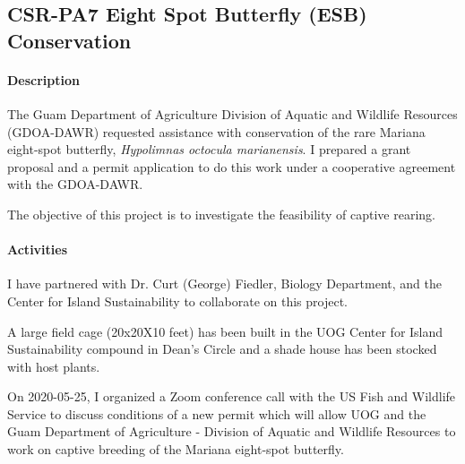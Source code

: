 \subsection{CSR-PA7 Eight Spot Butterfly (ESB) Conservation}
\begin{refsection}

\paragraph{Description}

The Guam Department of Agriculture Division of Aquatic and Wildlife
Resources (GDOA-DAWR) requested assistance with conservation of the
rare Mariana eight-spot butterfly, \emph{Hypolimnas octocula marianensis}. I prepared a grant proposal and a permit application to do this work under a cooperative agreement with the GDOA-DAWR.

The objective of this project is to investigate the feasibility of captive rearing.

\paragraph{Activities}

I have partnered with Dr. Curt (George) Fiedler, Biology Department, and the Center for Island Sustainability to collaborate on this project.

A large field cage (20x20X10 feet) has been built in the UOG Center for Island Sustainability compound in Dean's Circle and a shade house has been stocked with host plants. 

On 2020-05-25, I organized a Zoom conference call with the US Fish and Wildlife Service to discuss conditions of a new permit which will allow UOG and the Guam Department of Agriculture - Division of Aquatic and Wildlife Resources to work on captive breeding of the Mariana eight-spot butterfly.

\end{refsection}


